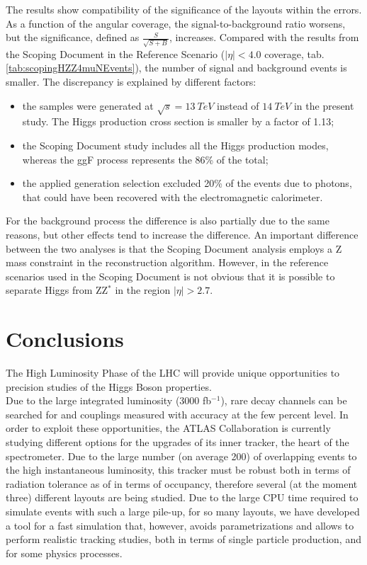 \documentclass[a4paper,twoside,12pt]{book}
\begin{document}
The results show compatibility of the significance of the layouts within the errors. As a function of the angular coverage, the 
signal-to-background ratio worsens, but the significance, defined as $\frac{S}{\sqrt{S+B}}$, increases. 
Compared with the results from the Scoping Document in the Reference Scenario 
($|\eta| < 4.0$ coverage, tab.\ref{tab:scopingHZZ4muNEvents}), the number of
signal and background events is smaller. The discrepancy is explained by 
different factors:\\
\begin{itemize}
\item the samples were generated at $\sqrt{s} = 13\ TeV$ instead of $14\ TeV$ in the present study. The Higgs
production cross section is smaller by a factor of 1.13; 
\item the Scoping Document study includes all the Higgs production modes, whereas the ggF process represents the 86\% of 
the total;
\item the applied generation selection excluded 20\% of the events due to photons, that could have been recovered with
	the electromagnetic calorimeter.
\end{itemize} 

For the background process the difference is also partially due to the same reasons, but other effects tend to increase the difference. 
An important difference between the two analyses is that the Scoping Document analysis employs a Z mass constraint
in the reconstruction algorithm. However, in the reference scenarios used in the Scoping Document is not obvious that it is possible to separate Higgs from ZZ$^{*}$ in the region $|\eta| > 2.7$.

\clearpage
\chapter{Conclusions}\label{sec:conclusions}
The High Luminosity Phase of the LHC will provide unique opportunities to precision studies of the Higgs Boson properties. \\

Due to the large integrated luminosity (3000 fb$^{-1}$), rare decay channels can be searched for and couplings measured with accuracy at the few percent level.
In order to exploit these opportunities, the ATLAS Collaboration is currently studying different options for the upgrades of its inner tracker, the heart of the spectrometer. Due to the large number (on average 200) of overlapping events to the high instantaneous luminosity, this tracker must be robust both in terms of radiation tolerance as of in terms of occupancy, therefore several (at the moment three) different layouts are being studied. Due to the large CPU time required to simulate events with such a large pile-up, for so many layouts, we have developed a tool for a fast simulation that, however, avoids parametrizations and allows to perform realistic tracking studies, both in terms of single particle production, and for some physics processes.\\
\end{document}
